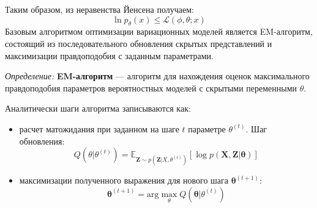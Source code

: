 Таким образом, из неравенства Йенсена получаем: 
$$
    \ln p_\theta(x) \le \mathcal{L}(\phi,\theta;x)
$$
Базовым алгоритмом оптимизации вариационных моделей является EM-алгоритм, состоящий из последовательного обновления
скрытых представлений и максимизации правдоподобия с заданным параметрами.

\textit{Определение:} \textbf{EM-алгоритм} --- алгоритм для нахождения оценок
максимального правдоподобия параметров  вероятностных моделей с скрытыми переменными $\theta$.

Аналитически шаги алгоритма записываются как: 
\begin{itemize}
    \item расчет матожидания при заданном на шаге $t$ параметре $\theta^{(t)}$.
    Шаг обновления:
    \begin{equation}
        Q(\theta| \theta^{(t)}) = \mathbb{E}_{\mathbf{Z} \sim p(\mathbf{Z}|X,\theta^{(t)})} \left[ \log p(\mathbf{X},\mathbf{Z}|\mathbf{\theta})\right]
    \end{equation}
    \item максимизации полученного выражения для нового шага $\mathbf{\theta}^{(t+1)}$: 
    \begin{equation}
        \mathbf{\theta}^{(t+1)} = \text{arg} \max_{\theta} Q(\mathbf{\theta}|\theta^{(t)})
    \end{equation}  
\end{itemize}
